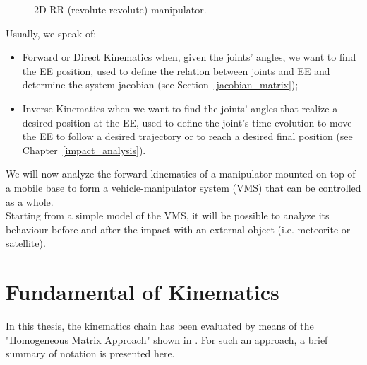 \documentclass[a4paper,12pt,oneside]{report}
\begin{document}
\begin{figure}[!]
  \centering
  
  \caption{2D RR (revolute-revolute) manipulator.}
  \label{end_defector}
\end{figure}
Usually, we speak of:
\begin{itemize}
  \item Forward or Direct Kinematics when, given the joints' angles, we want to find the EE position, used to define the relation between joints and EE and determine the system jacobian (see Section~\ref{jacobian_matrix});
  \item Inverse Kinematics when we want to find the joints' angles that realize a desired position at the EE, used to define the joint's time evolution to move the EE to follow a desired trajectory or to reach a desired final position (see Chapter~\ref{impact_analysis}).
\end{itemize}
We will now analyze the forward kinematics of a manipulator mounted on top of a mobile base to form a vehicle-manipulator system (VMS) that can be controlled as a whole.\\
Starting from a simple model of the VMS, it will be possible to analyze its behaviour before and after the impact with an external object (i.e. meteorite or satellite).
\newpage
\section{Fundamental of Kinematics}\label{Homogeneous}
In this thesis, the kinematics chain has been evaluated by means of the "Homogeneous Matrix Approach" shown in \cite{nine, ten}. For such an approach, a brief summary of notation is presented here.
\end{document}
